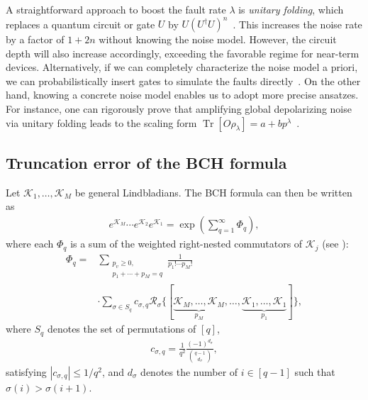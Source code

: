 \documentclass[aps,pra,reprint,groupedaddress,floatfix]{revtex4-2}
\newcommand{\mc}{\mathcal}
\newcommand{\sz}[1]{{\color{blue} Shuo: #1}}
\begin{document}
A straightforward approach to boost the fault rate $\lambda$ is \textit{unitary folding}, which replaces a quantum circuit or gate $U$ by $U(U^\dagger U)^n$~\cite{giurgica-tiron_digital_2020, DumitrescuEtAl2018, HeEtAl2020}. This increases the noise rate by a factor of $1+2n$ without knowing the noise model. However, the circuit depth will also increase accordingly, exceeding the favorable regime for near-term devices. Alternatively, if we can completely characterize the noise model a priori, we can probabilistically insert gates to simulate the faults directly~\cite {li2017efficient}. On the other hand, knowing a concrete noise model enables us to adopt more precise ansatzes. For instance, one can rigorously prove that amplifying global depolarizing noise via unitary folding leads to the scaling form $\operatorname{Tr}[O\rho_\lambda]=a+bp^\lambda$~\cite{giurgica-tiron_digital_2020}.




\subsection{Truncation error of the BCH formula}
\label{sec:bch-truncate}
Let $\mc K_1, \ldots, \mc K_M$ be general Lindbladians. The BCH formula can then be written as
\begin{align}
\label{eq:def-bch}
 	e^{\mc K_M}\cdots e^{\mc K_2}e^{\mc K_1} = \exp(\sum_{q = 1}^{\infty} \Phi_q),
\end{align}
where each $\Phi_q$ is a sum of the weighted right-nested commutators of $\mc K_j$ (see \citet{arnal2021note}):
\begin{align}
\label{eq:bch}
 	\Phi_q
    =
    & \sum_{\substack{p_v \ge 0,\\p_1+\cdots+p_M = q}}
    \frac{1}{p_1!\cdots p_M!}\\
    & \cdot \sum_{\sigma\in S_q} c_{\sigma, q}\mc R_{\sigma}
    \{[\underbrace{\mc K_M, \ldots, \mc K_M}_{p_M},
    \ldots,
    \underbrace{\mc K_1, \ldots, \mc K_1}_{p_1}]\},
\end{align}
where $S_q$ denotes the set of permutations of $[q]$, \begin{align}
\label{eq:def-c-sigma}
    c_{\sigma, q}=\frac{1}{q^2}\frac{(-1)^{d_{\sigma}}}{\binom{q-1}{d_\sigma}},
\end{align} satisfying $|c_{\sigma, q}|\le 1/q^2$, and $d_{\sigma}$ denotes the number of $i\in[q-1]$ such that $\sigma(i)>\sigma(i+1)$.
\end{document}
